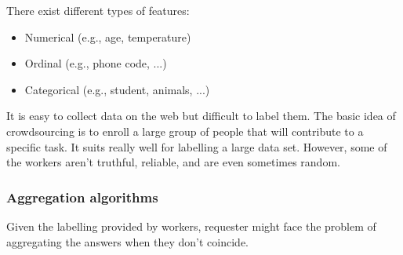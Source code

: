 There exist different types of features:
\begin{itemize}
	\item Numerical (e.g., age, temperature)
	\item Ordinal (e.g., phone code, ...)
	\item Categorical (e.g., student, animals, ...)
\end{itemize}

It is easy to collect data on the web but difficult to label them. The basic idea of crowdsourcing is to enroll a large group of people that will contribute to a specific task. It suits really well for labelling a large data set. However, some of the workers aren't truthful, reliable, and are even sometimes random.

\subsubsection*{Aggregation algorithms}
Given the labelling provided by workers, requester might face the problem of aggregating the answers when they don't coincide.

